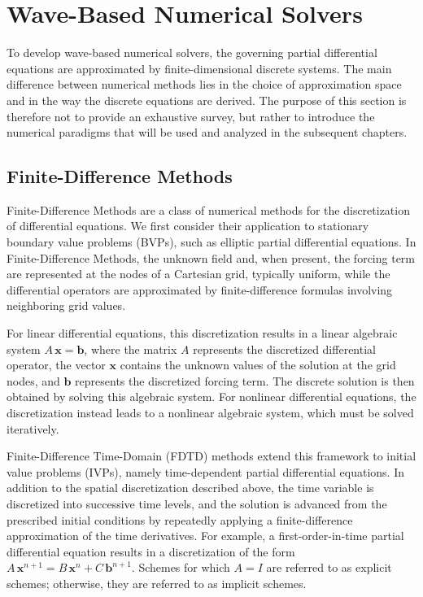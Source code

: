 \documentclass{Configuration_Files/PoliMi3i_thesis}
\begin{document}
\section{Wave-Based Numerical Solvers}
To develop wave-based numerical solvers, the governing partial differential equations are approximated by finite-dimensional discrete systems. The main difference between numerical methods lies in the choice of approximation space and in the way the discrete equations are derived. The purpose of this section is therefore not to provide an exhaustive survey, but rather to introduce the numerical paradigms that will be used and analyzed in the subsequent chapters.
%
\subsection{Finite-Difference Methods}
Finite-Difference Methods are a class of numerical methods for the discretization of differential equations. We first consider their application to stationary boundary value problems (BVPs), such as elliptic partial differential equations. In Finite-Difference Methods, the unknown field and, when present, the forcing term are represented at the nodes of a Cartesian grid, typically uniform, while the differential operators are approximated by finite-difference formulas involving neighboring grid values.

For linear differential equations, this discretization results in a linear algebraic system $A \, \mathbf{x}=\mathbf{b}$, where the matrix $A$ represents the discretized differential operator, the vector $\mathbf{x}$ contains the unknown values of the solution at the grid nodes, and $\mathbf{b}$ represents the discretized forcing term. The discrete solution is then obtained by solving this algebraic system. For nonlinear differential equations, the discretization instead leads to a nonlinear algebraic system, which must be solved iteratively.

Finite-Difference Time-Domain (FDTD) methods extend this framework to initial value problems (IVPs), namely time-dependent partial differential equations. In addition to the spatial discretization described above, the time variable is discretized into successive time levels, and the solution is advanced from the prescribed initial conditions by repeatedly applying a finite-difference approximation of the time derivatives. For example, a first-order-in-time partial differential equation results in a discretization of the form $A \, \mathbf{x}^{n+1} = B \, \mathbf{x}^n + C \, \mathbf{b}^{n+1}$. Schemes for which $A = I$ are referred to as explicit schemes; otherwise, they are referred to as implicit schemes.
\end{document}
